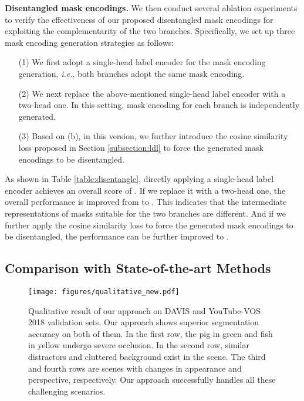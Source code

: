 \documentclass[10pt,twocolumn,letterpaper]{article}
\begin{document}
\noindent\textbf{Disentangled mask encodings.}
We then conduct several ablation experiments to verify the effectiveness of our proposed disentangled mask encodings for exploiting the complementarity of the two branches. Specifically, we set up three mask encoding generation strategies as follows:
\begin{enumerate}[itemsep= 0 pt,topsep = -1 pt, parsep=0 pt]
	\item[(1)] We first adopt a single-head label encoder for the mask encoding generation, \textit{i.e.}, both branches adopt the same mask encoding.
\item[(2)] We next replace the above-mentioned single-head label encoder with a two-head one. In this setting, mask encoding for each branch is independently generated.
	\item[(3)] Based on (b), in this version, we further introduce the cosine similarity loss proposed in Section \ref{subsection:ldl} to force the generated mask encodings to be disentangled.
\end{enumerate}
As shown in Table \ref{table:disentangle}, directly applying a single-head label encoder achieves an overall score of . If we replace it with a two-head one, the overall performance is improved from  to . This indicates that the intermediate representations of masks suitable for the two branches are different. And if we further apply the cosine similarity loss to force the generated mask encodings to be disentangled, the performance can be further improved to .


\subsection{Comparison with State-of-the-art Methods}

\begin{figure*}[htbp]
	\begin{center}
\texttt{[image: figures/qualitative\_new.pdf]}
	\vspace{-2.0em}
	\end{center}
	\caption{Qualitative result of our approach on DAVIS \cite{DAVIS2017} and YouTube-VOS 2018 \cite{Xu2018YouTubeVOSAL} validation sets.
	Our approach shows superior segmentation accuracy on both of them. In the first row, the pig in green and fish in yellow undergo severe occlusion. In the second row, similar distractors and cluttered background exist in the scene. The third and fourth rows are scenes with changes in appearance and perspective, respectively. Our approach successfully handles all these challenging scenarios.}
	\label{fig:qualitative}
	\vspace{-1.0em}
\end{figure*}
\end{document}
